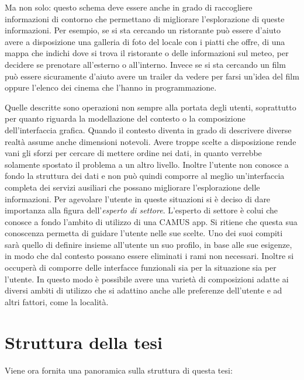 Ma non solo: questo schema deve essere anche in grado di raccogliere informazioni di contorno che permettano di migliorare l'esplorazione di queste informazioni. Per esempio, se si sta cercando un ristorante può essere d'aiuto avere a disposizione una galleria di foto del locale con i piatti che offre, di una mappa che indichi dove si trova il ristorante o delle informazioni sul meteo, per decidere se prenotare all'esterno o all'interno. Invece se si sta cercando un film può essere sicuramente d'aiuto avere un trailer da vedere per farsi un'idea del film oppure l'elenco dei cinema che l'hanno in programmazione.

Quelle descritte sono operazioni non sempre alla portata degli utenti, soprattutto per quanto riguarda la modellazione del contesto o la composizione dell'interfaccia grafica. Quando il contesto diventa in grado di descrivere diverse realtà assume anche dimensioni notevoli. Avere troppe scelte a disposizione rende vani gli sforzi per cercare di mettere ordine nei dati, in quanto verrebbe solamente spostato il problema a un altro livello. Inoltre l'utente non conosce a fondo la struttura dei dati e non può quindi comporre al meglio un'interfaccia completa dei servizi ausiliari che possano migliorare l'esplorazione delle informazioni. Per agevolare l'utente in queste situazioni si è deciso di dare importanza alla figura dell'\emph{esperto di settore}. L'esperto di settore è colui che conosce a fondo l'ambito di utilizzo di una CAMUS app. Si ritiene che questa sua conoscenza permetta di guidare l'utente nelle sue scelte. Uno dei suoi compiti sarà quello di definire insieme all'utente un suo profilo, in base alle sue esigenze, in modo che dal contesto possano essere eliminati i rami non necessari. Inoltre si occuperà di comporre delle interfacce funzionali sia per la situazione sia per l'utente. In questo modo è possibile avere una varietà di composizioni adatte ai diversi ambiti di utilizzo che si adattino anche alle preferenze dell'utente e ad altri fattori, come la località.

\section{Struttura della tesi}

Viene ora fornita una panoramica sulla struttura di questa tesi:

